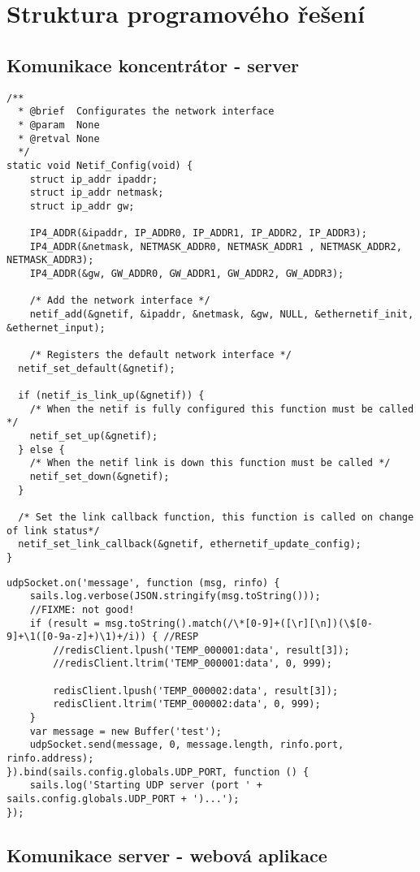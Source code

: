 \chapter{Struktura programového řešení}

\section{Komunikace koncentrátor - server}
\begin{verbatim}
/**
  * @brief  Configurates the network interface
  * @param  None
  * @retval None
  */
static void Netif_Config(void) {
	struct ip_addr ipaddr;
	struct ip_addr netmask;
	struct ip_addr gw;
	
	IP4_ADDR(&ipaddr, IP_ADDR0, IP_ADDR1, IP_ADDR2, IP_ADDR3);
	IP4_ADDR(&netmask, NETMASK_ADDR0, NETMASK_ADDR1 , NETMASK_ADDR2, NETMASK_ADDR3);
	IP4_ADDR(&gw, GW_ADDR0, GW_ADDR1, GW_ADDR2, GW_ADDR3);
	
	/* Add the network interface */
	netif_add(&gnetif, &ipaddr, &netmask, &gw, NULL, &ethernetif_init, &ethernet_input);
	
	/* Registers the default network interface */
  netif_set_default(&gnetif);
  
  if (netif_is_link_up(&gnetif)) {
    /* When the netif is fully configured this function must be called */
    netif_set_up(&gnetif);
  } else {
    /* When the netif link is down this function must be called */
    netif_set_down(&gnetif);
  }
  
  /* Set the link callback function, this function is called on change of link status*/
  netif_set_link_callback(&gnetif, ethernetif_update_config);
}
\end{verbatim}

\begin{verbatim}
udpSocket.on('message', function (msg, rinfo) {
    sails.log.verbose(JSON.stringify(msg.toString()));
    //FIXME: not good!
    if (result = msg.toString().match(/\*[0-9]+([\r][\n])(\$[0-9]+\1([0-9a-z]+)\1)+/i)) { //RESP
        //redisClient.lpush('TEMP_000001:data', result[3]);
        //redisClient.ltrim('TEMP_000001:data', 0, 999);

        redisClient.lpush('TEMP_000002:data', result[3]);
        redisClient.ltrim('TEMP_000002:data', 0, 999);
    }
    var message = new Buffer('test');
    udpSocket.send(message, 0, message.length, rinfo.port, rinfo.address);
}).bind(sails.config.globals.UDP_PORT, function () {
    sails.log('Starting UDP server (port ' + sails.config.globals.UDP_PORT + ')...');
});
\end{verbatim}

\section{Komunikace server - webová aplikace}